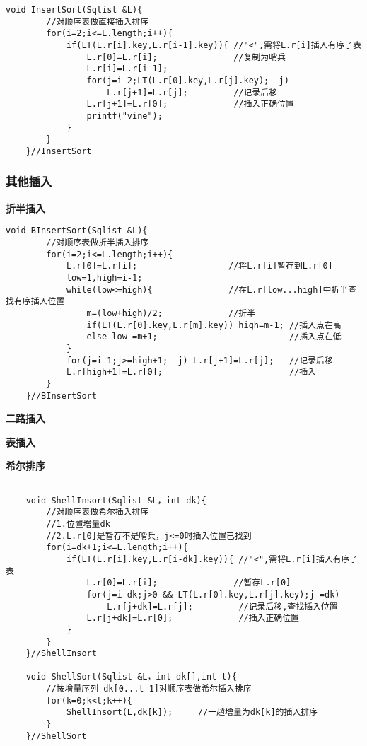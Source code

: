 \documentclass[UTF8]{ctexart}
\newcommand{\mb}[1]{\textbf{#1}}
\newcommand{\p}{\par}
\begin{document}
\begin{lstlisting}[style=v1]
    void InsertSort(Sqlist &L){
        //对顺序表做直接插入排序
        for(i=2;i<=L.length;i++){
            if(LT(L.r[i].key,L.r[i-1].key)){ //"<",需将L.r[i]插入有序子表
                L.r[0]=L.r[i];               //复制为哨兵
                L.r[i]=L.r[i-1];
                for(j=i-2;LT(L.r[0].key,L.r[j].key);--j)
                    L.r[j+1]=L.r[j];         //记录后移  
                L.r[j+1]=L.r[0];             //插入正确位置
                printf("vine");
            }
        }
    }//InsertSort
\end{lstlisting}

\subsubsection{其他插入}

\mb{折半插入}
\begin{lstlisting}[style=v1]
    void BInsertSort(Sqlist &L){
        //对顺序表做折半插入排序
        for(i=2;i<=L.length;i++){
            L.r[0]=L.r[i];                  //将L.r[i]暂存到L.r[0]
            low=1,high=i-1;
            while(low<=high){               //在L.r[low...high]中折半查找有序插入位置
                m=(low+high)/2;             //折半
                if(LT(L.r[0].key,L.r[m].key)) high=m-1; //插入点在高
                else low =m+1;                          //插入点在低   
            }
            for(j=i-1;j>=high+1;--j) L.r[j+1]=L.r[j];   //记录后移
            L.r[high+1]=L.r[0];                         //插入
        }
    }//BInsertSort
\end{lstlisting}\p
\mb{二路插入}\p
\mb{表插入}\p

\newpage
\mb{希尔排序}

\begin{lstlisting}[style=v1]

    void ShellInsort(Sqlist &L，int dk){
        //对顺序表做希尔插入排序
        //1.位置增量dk
        //2.L.r[0]是暂存不是哨兵，j<=0时插入位置已找到
        for(i=dk+1;i<=L.length;i++){
            if(LT(L.r[i].key,L.r[i-dk].key)){ //"<",需将L.r[i]插入有序子表
                L.r[0]=L.r[i];               //暂存L.r[0]
                for(j=i-dk;j>0 && LT(L.r[0].key,L.r[j].key);j-=dk)
                    L.r[j+dk]=L.r[j];         //记录后移,查找插入位置
                L.r[j+dk]=L.r[0];             //插入正确位置
            }
        }
    }//ShellInsort

    void ShellSort(Sqlist &L，int dk[],int t){
        //按增量序列 dk[0...t-1]对顺序表做希尔插入排序
        for(k=0;k<t;k++){
            ShellInsort(L,dk[k]);     //一趟增量为dk[k]的插入排序
        }
    }//ShellSort


\end{lstlisting}
\end{document}
